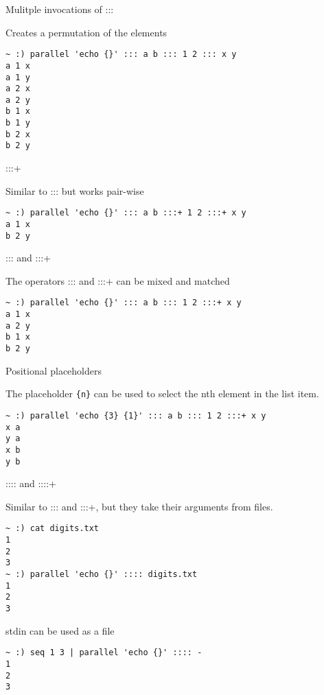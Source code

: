 \documentclass{beamer}
\renewcommand\big[1]{
  \begin{center}
    \Large{#1}
  \end{center}
}
\begin{document}
\begin{frame}[fragile]
  \big{Mulitple invocations of :::}
  Creates a permutation of the elements
\begin{verbatim}
~ :) parallel 'echo {}' ::: a b ::: 1 2 ::: x y
a 1 x
a 1 y
a 2 x
a 2 y
b 1 x
b 1 y
b 2 x
b 2 y
\end{verbatim}
\end{frame}

\begin{frame}[fragile]
  \big{:::+}
  Similar to ::: but works pair-wise
\begin{verbatim}
~ :) parallel 'echo {}' ::: a b :::+ 1 2 :::+ x y
a 1 x
b 2 y
\end{verbatim}
\end{frame}

\begin{frame}[fragile]
  \big{::: and :::+}
  The operators ::: and :::+ can be mixed and matched
\begin{verbatim}
~ :) parallel 'echo {}' ::: a b ::: 1 2 :::+ x y
a 1 x
a 2 y
b 1 x
b 2 y
\end{verbatim}
\end{frame}

\begin{frame}[fragile]
  \big{Positional placeholders}
  The placeholder \texttt{\{n\}} can be used to select the nth element in the list item.
\begin{verbatim}
~ :) parallel 'echo {3} {1}' ::: a b ::: 1 2 :::+ x y
x a
y a
x b
y b
\end{verbatim}
\end{frame}

\begin{frame}[fragile]
  \big{:::: and ::::+}
  Similar to ::: and :::+, but they take their arguments from files.
\begin{verbatim}
~ :) cat digits.txt
1
2
3
~ :) parallel 'echo {}' :::: digits.txt
1
2
3
\end{verbatim}
\end{frame}

\begin{frame}[fragile]
  \big{stdin can be used as a file}
\begin{verbatim}
~ :) seq 1 3 | parallel 'echo {}' :::: -
1
2
3
\end{verbatim}
\end{frame}
\end{document}

